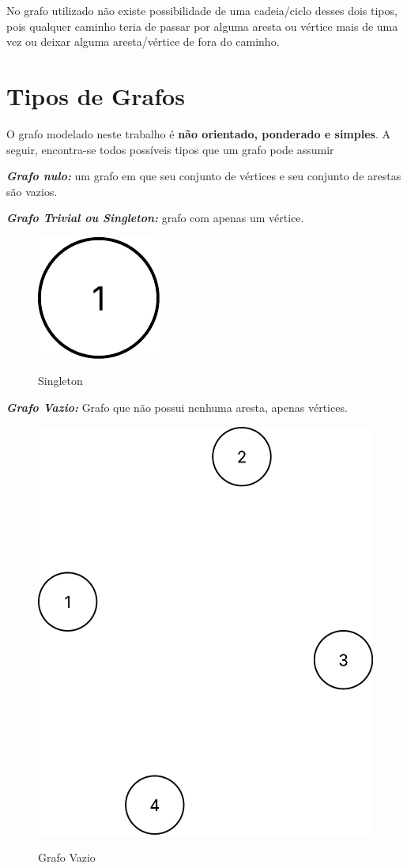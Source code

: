 No grafo utilizado não existe possibilidade de uma cadeia/ciclo desses dois tipos, pois qualquer caminho teria de passar por alguma aresta ou vértice mais de uma vez ou deixar alguma aresta/vértice de fora do caminho.


\section{Tipos de Grafos}\label{sec:tiposGrafos}
O grafo modelado neste trabalho é \textbf{não orientado, ponderado e simples}. A seguir, encontra-se todos possíveis tipos que um grafo pode assumir

\textit{\textbf{Grafo nulo:}} um grafo em que seu conjunto de vértices e seu conjunto de arestas são vazios. \par
\textit{\textbf{Grafo Trivial ou Singleton:}} grafo com apenas um vértice.
\begin{figure} [H]
	\centering
	\caption{Singleton}%
	\label{fig:singleton}%
	\includegraphics[width=0.1\linewidth,angle=0]{figuras/tiposgrafos/singleton.png}%
	\\
\end{figure}
\par
\textit{\textbf{Grafo Vazio:}} Grafo que não possui nenhuma aresta, apenas vértices.
\begin{figure} [H]
	\centering
	\caption{Grafo Vazio}%
	\label{fig:grafVazio}%
	\includegraphics[width=0.5\linewidth,angle=0]{figuras/tiposgrafos/grafVazio.png}%
	\\
\end{figure}
